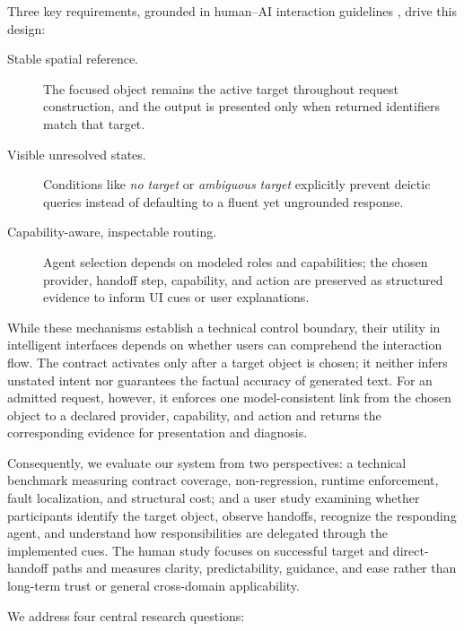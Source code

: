 Three key requirements, grounded in human--AI interaction guidelines
\cite{amershi2019guidelines,yang2020reexamining,weisz2024design}, drive this design:

\begin{description}
\item[Stable spatial reference.] The focused object remains the active
target throughout request construction, and the output is presented only when
returned identifiers match that target.

\item[Visible unresolved states.] Conditions like \emph{no target} or
\emph{ambiguous target} explicitly prevent deictic queries instead of
defaulting to a fluent yet ungrounded response.

\item[Capability-aware, inspectable routing.] Agent selection depends on
modeled roles and capabilities; the chosen provider, handoff step, capability,
and action are preserved as structured evidence to inform UI cues or user
explanations.
\end{description}

While these mechanisms establish a technical control boundary, their utility in
intelligent interfaces depends on whether users can comprehend the interaction
flow. The contract activates only after a target object is chosen; it neither
infers unstated intent nor guarantees the factual accuracy of generated text.
For an admitted request, however, it enforces one model-consistent link from the
chosen object to a declared provider, capability, and action and returns the
corresponding evidence for presentation and diagnosis.

Consequently, we evaluate our system from two perspectives: a technical benchmark
measuring contract coverage, non-regression, runtime enforcement, fault
localization, and structural cost; and a user study examining whether
participants identify the target object, observe handoffs, recognize the
responding agent, and understand how responsibilities are delegated through the
implemented cues. The human study focuses on successful target and direct-handoff
paths and measures clarity, predictability, guidance, and ease rather than
long-term trust or general cross-domain applicability.

We address four central research questions:

